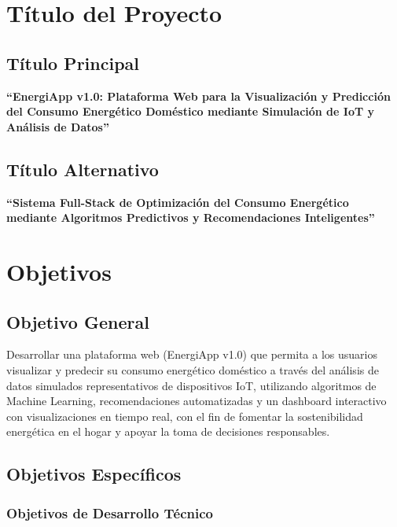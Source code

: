 \documentclass[12pt,a4paper,spanish]{article}
\begin{document}
\section{Título del Proyecto}

\subsection{Título Principal}

\textbf{``EnergiApp v1.0: Plataforma Web para la Visualización y Predicción del Consumo Energético Doméstico mediante Simulación de IoT y Análisis de Datos''}

\subsection{Título Alternativo}

\textbf{``Sistema Full-Stack de Optimización del Consumo Energético mediante Algoritmos Predictivos y Recomendaciones Inteligentes''}

\section{Objetivos}

\subsection{Objetivo General}

Desarrollar una plataforma web (EnergiApp v1.0) que permita a los usuarios visualizar y predecir su consumo energético doméstico a través del análisis de datos simulados representativos de dispositivos IoT, utilizando algoritmos de Machine Learning, recomendaciones automatizadas y un dashboard interactivo con visualizaciones en tiempo real, con el fin de fomentar la sostenibilidad energética en el hogar y apoyar la toma de decisiones responsables.

\subsection{Objetivos Específicos}

\subsubsection{Objetivos de Desarrollo Técnico}
\end{document}
